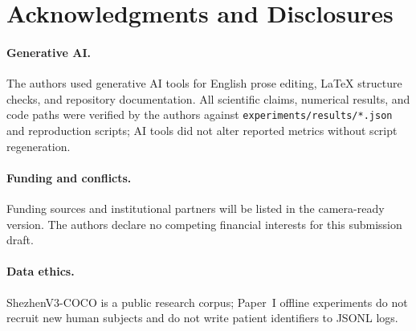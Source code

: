 \section*{Acknowledgments and Disclosures}

\paragraph{Generative AI.}
The authors used generative AI tools for English prose editing, LaTeX structure checks, and repository documentation.
All scientific claims, numerical results, and code paths were verified by the authors against \texttt{experiments/results/*.json} and reproduction scripts; AI tools did not alter reported metrics without script regeneration.

\paragraph{Funding and conflicts.}
Funding sources and institutional partners will be listed in the camera-ready version.
The authors declare no competing financial interests for this submission draft.

\paragraph{Data ethics.}
ShezhenV3-COCO is a public research corpus; Paper~I offline experiments do not recruit new human subjects and do not write patient identifiers to JSONL logs.
